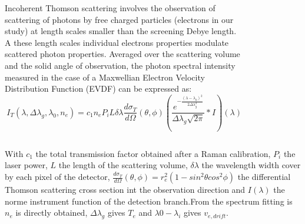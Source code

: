 \documentclass{beamer}
\begin{document}
\begin{frame}{}
\begin{tcbposter}
{\begin{columns}
	\begin{column}{0.38\paperwidth}
	Incoherent Thomson scattering involves the observation of scattering of photons by free charged particles (electrons in our study) at length scales smaller than the screening Debye length. A these length scales individual electrons properties modulate scattered photon properties. Averaged over the scattering volume and the solid angle of observation, the photon spectral intensity measured in the case of a Maxwellian Electron Velocity Distribution Function (EVDF) can be expressed as:
	\begin{equation}
	I_{T}(\lambda,\Delta \lambda_{g}, \lambda_{0},n_{e})=c_{1}n_{e} P_{i}L\delta \lambda \frac{d \sigma_{T}}{d \Omega}(\theta, \phi) \left( \frac{e^{- \frac{(\lambda-\lambda_{0})^{2}}{2 \Delta \lambda_{g}^{2}}}}{\Delta \lambda_{g} \sqrt{2 \pi}} \ast I \right) (\lambda) 	
	\end{equation}
	\end{column}

	\begin{column}{0.22\paperwidth}
	\begin{figure}
	\includegraphics[width=0.2\paperwidth]{Scattering_Configuration_angles_bright.pdf}
	\end{figure}
	\end{column}
\end{columns}
		
	With $c_{1}$ the total transmission factor obtained after a Raman calibration, $P_{i}$ the laser power, $L$ the length of the scattering volume, $\delta \lambda$ the wavelength width cover by each pixel of the detector, $\frac{d \sigma_{T}}{d \Omega}(\theta, \phi)= r_{e}^{2}(1-sin^{2}\theta cos^{2} \phi)$ the differential Thomson scattering cross section int the observation direction and $I(\lambda)$ the norme instrument function of the detection branch.From the spectrum fitting is $n_{e}$ is directly obtained, $\Delta \lambda_{g}$ gives $T_{e}$ and $\lambda{0}-\lambda_{i}$ gives $v_{e,drift}$.
	
}
\end{tcbposter}
\end{frame}
\end{document}
